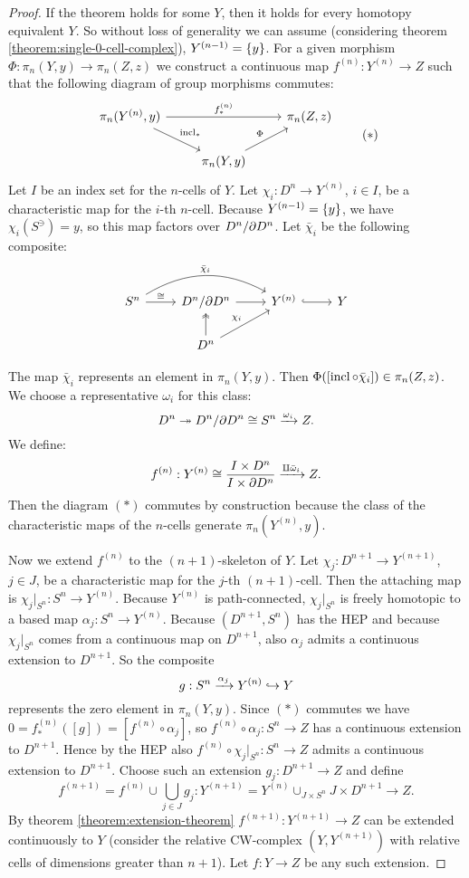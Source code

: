\begin{proof}
If the theorem holds for some $Y$, then it holds for every homotopy equivalent $Y$. So without loss of generality we can assume (considering theorem \ref{theorem:single-0-cell-complex}), $Y^{({n-1})}=\{y\}$. For a given morphism $\Phi:\pi_n(Y,y)\to\pi_n(Z,z)$ we construct a continuous map $f^{(n)}:Y^{(n)}\to Z$ such that the following diagram of group morphisms commutes:
\[\begin{tikzcd}
\pi_n(Y^{(n)},y) \ar[dr,"\incl_*"] \ar[rr,"f^{(n)}_*"] & & \pi_n(Z,z) \\
& \pi_n(Y,y) \ar[ur,"\Phi"] &
\end{tikzcd}
\tag{$*$}\]
Let $I$ be an index set for the $n$-cells of $Y$. Let $\chi_i:D^n\to Y^{(n)}$, $i\in I$, be a characteristic map for the $i$-th $n$-cell. Because $Y^{({n-1})}=\{y\}$, we have $\chi_i(S^\ni)=y$, so this map factors over $D^n/\partial D^n$. Let $\bar\chi_i$ be the following composite:
\[\begin{tikzcd}
S^n \ar[r,"\cong"] \ar[rr,bend left,"\bar\chi_i"] & D^n/\de D^n \ar[r] & Y^{(n)} \ar[r,hook] & Y \\
& D^n \ar[u,two heads] \ar[ur,"\chi_i"] & & 
\end{tikzcd}\]

The map $\bar\chi_i$ represents an element in $\pi_n(Y,y)$. Then $\Phi([\operatorname{incl}\circ\bar\chi_i])\in\pi_n(Z,z)$. We choose a representative $\omega_i$ for this class:
\[D^n\twoheadrightarrow D^n/\partial D^n\cong S^n\xrightarrow{\omega_i}Z.\]
We define:
\[f^{(n)}:Y^{(n)}\cong\frac{I\times D^n}{I\times\partial D^n}\xrightarrow{\amalg\bar\omega_i}Z.\]
Then the diagram $(*)$ commutes by construction because the class of the characteristic maps of the $n$-cells generate $\pi_n(Y^{(n)},y)$.

Now we extend $f^{(n)}$ to the $(n+1)$-skeleton of $Y$. Let $\chi_j:D^{n+1}\to Y^{(n+1)}$, $j\in J$, be a characteristic map for the $j$-th $(n+1)$-cell. Then the attaching map is $\chi_j|_{S^n}:S^n\to Y^{(n)}$. Because $Y^{(n)}$ is path-connected, $\chi_j|_{S^n}$ is freely homotopic to a based map $\alpha_j:S^n\to Y^{(n)}$. Because $(D^{n+1},S^n)$ has the HEP and because $\chi_j|_{S^n}$ comes from a continuous map on $D^{n+1}$, also $\alpha_j$ admits a continuous extension to $D^{n+1}$. So the composite
\[g:S^n\xrightarrow{\alpha_j}Y^{(n)}\hookrightarrow Y\]
represents the zero element in $\pi_n(Y,y)$. Since $(*)$ commutes we have $0=f^{(n)}_*([g])=[f^{(n)}\circ\alpha_j]$, so $f^{(n)}\circ\alpha_j:S^n\to Z$ has a continuous extension to $D^{n+1}$. Hence by the HEP also $f^{(n)}\circ\chi_j|_{S^n}:S^n\to Z$ admits a continuous extension to $D^{n+1}$. Choose such an extension $g_j:D^{n+1}\to Z$ and define
\[f^{(n+1)}=f^{(n)}\cup\bigcup_{j\in J}g_j:Y^{(n+1)}=Y^{(n)}\cup_{J\times S^n}J\times D^{n+1}\to Z.\]
By theorem \ref{theorem:extension-theorem} $f^{(n+1)}:Y^{(n+1)}\to Z$ can be extended continuously to $Y$ (consider the relative CW-complex $(Y,Y^{(n+1)})$ with relative cells of dimensions greater than $n+1$). Let $f:Y\to Z$ be any such extension.


\end{proof}
